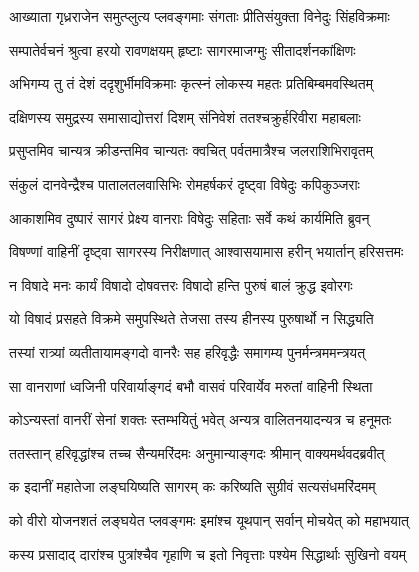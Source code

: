 
\twolineshloka
{आख्याता गृध्रराजेन समुत्प्लुत्य प्लवङ्गमाः}
{संगताः प्रीतिसंयुक्ता विनेदुः सिंहविक्रमाः} %

\twolineshloka
{सम्पातेर्वचनं श्रुत्वा हरयो रावणक्षयम्}
{हृष्टाः सागरमाजग्मुः सीतादर्शनकांक्षिणः} %

\twolineshloka
{अभिगम्य तु तं देशं ददृशुर्भीमविक्रमाः}
{कृत्स्नं लोकस्य महतः प्रतिबिम्बमवस्थितम्} %

\twolineshloka
{दक्षिणस्य समुद्रस्य समासाद्योत्तरां दिशम्}
{संनिवेशं ततश्चक्रुर्हरिवीरा महाबलाः} %

\twolineshloka
{प्रसुप्तमिव चान्यत्र क्रीडन्तमिव चान्यतः}
{क्वचित् पर्वतमात्रैश्च जलराशिभिरावृतम्} %

\twolineshloka
{संकुलं दानवेन्द्रैश्च पातालतलवासिभिः}
{रोमहर्षकरं दृष्ट्वा विषेदुः कपिकुञ्जराः} %

\twolineshloka
{आकाशमिव दुष्पारं सागरं प्रेक्ष्य वानराः}
{विषेदुः सहिताः सर्वे कथं कार्यमिति ब्रुवन्} %

\twolineshloka
{विषण्णां वाहिनीं दृष्ट्वा सागरस्य निरीक्षणात्}
{आश्वासयामास हरीन् भयार्तान् हरिसत्तमः} %

\twolineshloka
{न विषादे मनः कार्यं विषादो दोषवत्तरः}
{विषादो हन्ति पुरुषं बालं क्रुद्ध इवोरगः} %

\twolineshloka
{यो विषादं प्रसहते विक्रमे समुपस्थिते}
{तेजसा तस्य हीनस्य पुरुषार्थो न सिद्ध्यति} %

\twolineshloka
{तस्यां रात्र्यां व्यतीतायामङ्गदो वानरैः सह}
{हरिवृद्धैः समागम्य पुनर्मन्त्रममन्त्रयत्} %

\twolineshloka
{सा वानराणां ध्वजिनी परिवार्याङ्गदं बभौ}
{वासवं परिवार्येव मरुतां वाहिनी स्थिता} %

\twolineshloka
{कोऽन्यस्तां वानरीं सेनां शक्तः स्तम्भयितुं भवेत्}
{अन्यत्र वालितनयादन्यत्र च हनूमतः} %

\twolineshloka
{ततस्तान् हरिवृद्धांश्च तच्च सैन्यमरिंदमः}
{अनुमान्याङ्गदः श्रीमान् वाक्यमर्थवदब्रवीत्} %

\twolineshloka
{क इदानीं महातेजा लङ्घयिष्यति सागरम्}
{कः करिष्यति सुग्रीवं सत्यसंधमरिंदमम्} %

\twolineshloka
{को वीरो योजनशतं लङ्घयेत प्लवङ्गमः}
{इमांश्च यूथपान् सर्वान् मोचयेत् को महाभयात्} %

\twolineshloka
{कस्य प्रसादाद् दारांश्च पुत्रांश्चैव गृहाणि च}
{इतो निवृत्ताः पश्येम सिद्धार्थाः सुखिनो वयम्} %

